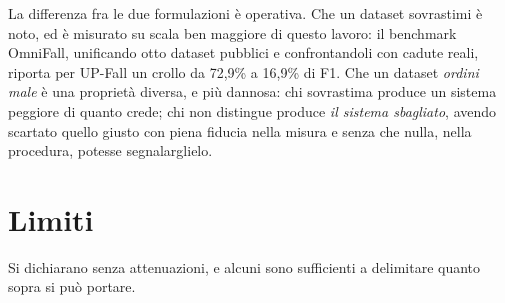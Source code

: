 La differenza fra le due formulazioni è operativa. Che un dataset sovrastimi è noto, ed è misurato su scala ben maggiore di questo lavoro: il benchmark OmniFall, unificando otto dataset pubblici e confrontandoli con cadute reali, riporta per UP-Fall un crollo da 72,9\% a 16,9\% di F1. Che un dataset \emph{ordini male} è una proprietà diversa, e più dannosa: chi sovrastima produce un sistema peggiore di quanto crede; chi non distingue produce \emph{il sistema sbagliato}, avendo scartato quello giusto con piena fiducia nella misura e senza che nulla, nella procedura, potesse segnalarglielo.

\section{Limiti}
\label{sec:limiti}

Si dichiarano senza attenuazioni, e alcuni sono sufficienti a delimitare quanto sopra si può portare.

